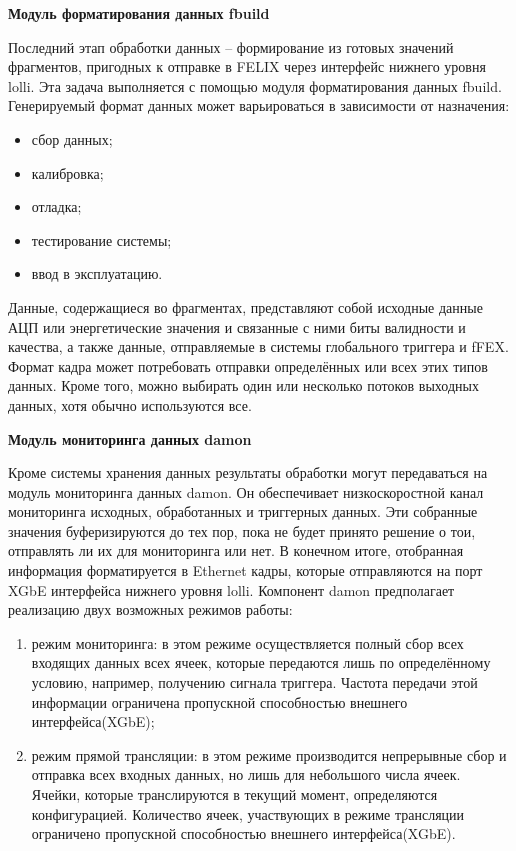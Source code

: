\textbf{Модуль форматирования данных fbuild}\par
Последний этап обработки данных -- формирование из готовых значений фрагментов, пригодных к отправке в FELIX через интерфейс нижнего уровня lolli. Эта задача выполняется с помощью модуля форматирования данных fbuild. Генерируемый формат данных может варьироваться в зависимости от назначения:\par
\begin{itemize}
    \item сбор данных;
    \item калибровка;
    \item отладка;
    \item тестирование системы;
    \item ввод в эксплуатацию.
\end{itemize}\par
Данные, содержащиеся во фрагментах, представляют собой исходные данные АЦП или энергетические значения и связанные с ними биты валидности и качества, а также данные, отправляемые в системы глобального триггера и fFEX. Формат кадра может потребовать отправки определённых или всех этих типов данных. Кроме того, можно выбирать один или несколько потоков выходных данных, хотя обычно используются все.\par
\textbf{Модуль мониторинга данных damon}\par
Кроме системы хранения данных результаты обработки могут передаваться на модуль мониторинга данных damon. Он обеспечивает низкоскоростной канал мониторинга исходных, обработанных и триггерных данных. Эти собранные значения буферизируются до тех пор, пока не будет принято решение о тои, отправлять ли их для мониторинга или нет. В конечном итоге, отобранная информация форматируется в Ethernet кадры, которые отправляются на порт XGbE интерфейса нижнего уровня lolli. Компонент damon предполагает реализацию двух возможных режимов работы:\par
\begin{enumerate}
    \item режим мониторинга: в этом режиме осуществляется полный сбор всех входящих данных всех ячеек, которые передаются лишь по определённому условию, например, получению сигнала триггера. Частота передачи этой информации ограничена пропускной способностью внешнего интерфейса(XGbE);
    \item режим прямой трансляции: в этом режиме производится непрерывные сбор и отправка всех входных данных, но лишь для небольшого числа ячеек. Ячейки, которые транслируются в текущий момент, определяются конфигурацией. Количество ячеек, участвующих в режиме трансляции ограничено пропускной способностью внешнего интерфейса(XGbE).
\end{enumerate}\par
